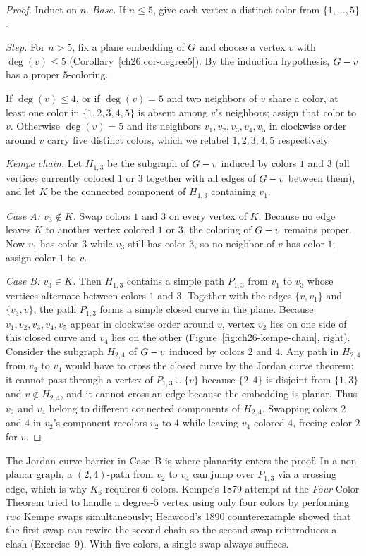 \begin{proof}
Induct on $n$. \emph{Base.} If $n\le 5$, give each vertex a distinct color from
$\{1,\dots,5\}$.

\emph{Step.} For $n>5$, fix a plane embedding of $G$ and choose a vertex $v$ with
$\deg(v)\le 5$ (Corollary~\ref{ch26:cor-degree5}). By the induction hypothesis, $G-v$
has a proper $5$-coloring.

If $\deg(v)\le 4$, or if $\deg(v)=5$ and two neighbors of $v$ share a color, at least one
color in $\{1,2,3,4,5\}$ is absent among $v$'s neighbors; assign that color to $v$.
Otherwise $\deg(v)=5$ and its neighbors $v_1,v_2,v_3,v_4,v_5$ in clockwise order around $v$
carry five distinct colors, which we relabel $1,2,3,4,5$ respectively.

\emph{Kempe chain.} Let $H_{1,3}$ be the subgraph of $G - v$ induced by colors $1$ and
$3$ (all vertices currently colored $1$ or $3$ together with all edges of $G-v$ between
them), and let $K$ be the connected component of $H_{1,3}$ containing $v_1$.

\emph{Case A: $v_3 \notin K$.} Swap colors $1$ and $3$ on every vertex of $K$. Because no
edge leaves $K$ to another vertex colored $1$ or $3$, the coloring of $G - v$ remains
proper. Now $v_1$ has color $3$ while $v_3$ still has color $3$, so no neighbor of $v$ has
color $1$; assign color $1$ to $v$.

\emph{Case B: $v_3 \in K$.} Then $H_{1,3}$ contains a simple path $P_{1,3}$ from $v_1$ to
$v_3$ whose vertices alternate between colors $1$ and $3$. Together with the edges
$\{v,v_1\}$ and $\{v_3,v\}$, the path $P_{1,3}$ forms a simple closed curve in the plane.
Because $v_1,v_2,v_3,v_4,v_5$ appear in clockwise order around $v$, vertex $v_2$ lies on
one side of this closed curve and $v_4$ lies on the other (Figure~\ref{fig:ch26-kempe-chain},
right). Consider the subgraph $H_{2,4}$ of $G - v$ induced by colors $2$ and $4$. Any
path in $H_{2,4}$ from $v_2$ to $v_4$ would have to cross the closed curve by the Jordan
curve theorem: it cannot pass through a vertex of $P_{1,3}\cup\{v\}$ because $\{2,4\}$ is
disjoint from $\{1,3\}$ and $v \notin H_{2,4}$, and it cannot cross an edge because the
embedding is planar. Thus $v_2$ and $v_4$ belong to different connected components of
$H_{2,4}$. Swapping colors $2$ and $4$ in $v_2$'s component recolors $v_2$ to $4$ while
leaving $v_4$ colored $4$, freeing color $2$ for $v$.
\end{proof}

\begin{whybox}
The Jordan-curve barrier in Case~B is where planarity enters the proof. In a non-planar
graph, a $(2,4)$-path from $v_2$ to $v_4$ can jump over $P_{1,3}$ via a crossing edge,
which is why $K_6$ requires $6$ colors. Kempe's 1879 attempt at the \emph{Four} Color
Theorem tried to handle a degree-$5$ vertex using only four colors by performing \emph{two}
Kempe swaps simultaneously; Heawood's 1890 counterexample showed that the first swap can
rewire the second chain so the second swap reintroduces a clash (Exercise~9). With five
colors, a single swap always suffices.
\end{whybox}

